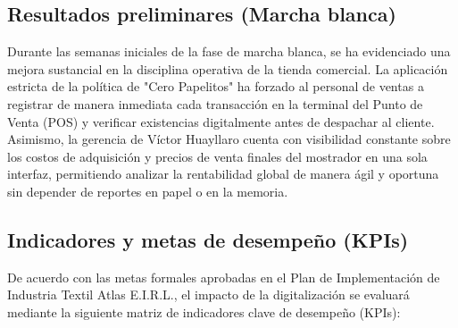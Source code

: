 \subsection{Resultados preliminares (Marcha blanca)}
\begin{indentedsubsection}
Durante las semanas iniciales de la fase de marcha blanca, se ha evidenciado una mejora sustancial en la disciplina operativa de la tienda comercial. La aplicación estricta de la política de "Cero Papelitos" ha forzado al personal de ventas a registrar de manera inmediata cada transacción en la terminal del Punto de Venta (POS) y verificar existencias digitalmente antes de despachar al cliente. Asimismo, la gerencia de Víctor Huayllaro cuenta con visibilidad constante sobre los costos de adquisición y precios de venta finales del mostrador en una sola interfaz, permitiendo analizar la rentabilidad global de manera ágil y oportuna sin depender de reportes en papel o en la memoria.
\end{indentedsubsection}

\subsection{Indicadores y metas de desempeño (KPIs)}
\begin{indentedsubsection}
De acuerdo con las metas formales aprobadas en el Plan de Implementación de Industria Textil Atlas E.I.R.L., el impacto de la digitalización se evaluará mediante la siguiente matriz de indicadores clave de desempeño (KPIs):
\end{indentedsubsection}

